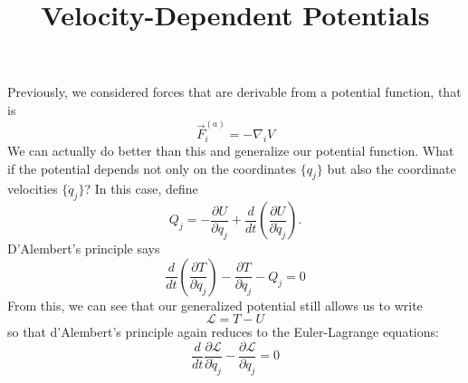 \documentclass{article}
\title{Velocity-Dependent Potentials}
\begin{document}
Previously, we considered forces that are derivable from a potential function,
that is
\begin{equation}
  \vec{F}_i^{(a)} = -\nabla_iV
\end{equation}
We can actually do better than this and generalize our potential function. What
if the potential depends not only on the coordinates $\{q_j\}$ but also the
coordinate velocities $\{\dot{q}_j\}$? In this case, define
\begin{equation}
  Q_j = -\frac{\partial U}{\partial q_j}+\frac{d}{dt}\left( \frac{\partial U}{\partial \dot{q}_j} \right).
\end{equation}
D'Alembert's principle says
\begin{equation}
  \frac{d}{dt}\left( \frac{\partial T}{\partial \dot{q}_j} \right)-\frac{\partial T}{\partial q_j}-Q_j = 0
\end{equation}
From this, we can see that our generalized potential still allows us to write
\begin{equation}
  \mathcal{L}= T-U
\end{equation}
so that d'Alembert's principle again reduces to the Euler-Lagrange equations:
\begin{equation}
  \frac{d}{dt}\frac{\partial \mathcal{L}}{\partial \dot{q}_j}-\frac{\partial \mathcal{L}}{\partial q_j} = 0 
\end{equation}
\end{document}
